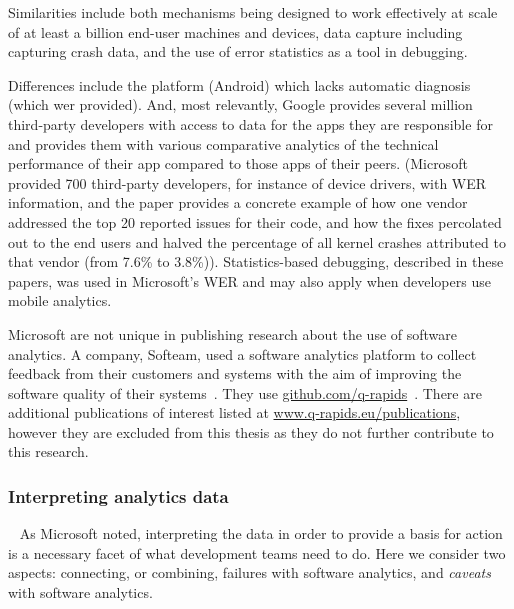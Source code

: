 Similarities include both mechanisms being designed to work effectively at scale of at least a billion end-user machines and devices, data capture including capturing crash data, and the use of error statistics as a tool in debugging.

Differences include the platform (Android) which lacks automatic diagnosis (which \Gls{wer} provided). And, most relevantly, Google provides several million third-party developers with access to data for the apps they are responsible for and provides them with various comparative analytics of the technical performance of their app compared to those apps of their peers. (Microsoft provided 700 third-party developers, for instance of device drivers, with WER information, and the paper provides a concrete example of how one vendor addressed the top 20 reported issues for their code, and how the fixes percolated out to the end users and halved the percentage of all kernel crashes attributed to that vendor (from 7.6\% to 3.8\%)). Statistics-based debugging, described in these papers, was used in Microsoft's WER and may also apply when developers use mobile analytics.

Microsoft are not unique in publishing research about the use of software analytics. A company, Softeam, used a software analytics platform to collect feedback from their customers and systems with the aim of improving the software quality of their systems~. They use \href{https://github.com/q-rapids}{github.com/q-rapids}~. There are additional publications of interest listed at \href{https://www.q-rapids.eu/publications}{www.q-rapids.eu/publications}, however they are excluded from this thesis as they do not further contribute to this research.


\subsubsection{Interpreting analytics data}~\label{rw-interpreting-analytics-data-research}
As Microsoft noted, interpreting the data in order to provide a basis for action is a necessary facet of what development teams need to do. Here we consider two aspects: connecting, or combining, failures with software analytics, and \emph{caveats} with software analytics.

